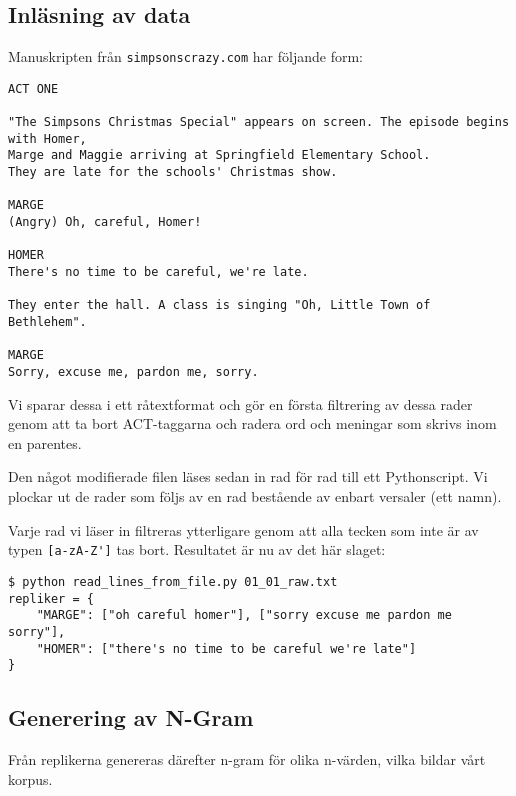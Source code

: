 \documentclass[a4paper]{article}
\begin{document}
\subsection{Inläsning av data}
Manuskripten från \nolinkurl{simpsonscrazy.com} har följande form:
\begin{verbatim}
ACT ONE

"The Simpsons Christmas Special" appears on screen. The episode begins with Homer,
Marge and Maggie arriving at Springfield Elementary School.
They are late for the schools' Christmas show.

MARGE
(Angry) Oh, careful, Homer!

HOMER
There's no time to be careful, we're late.

They enter the hall. A class is singing "Oh, Little Town of Bethlehem".

MARGE
Sorry, excuse me, pardon me, sorry.
\end{verbatim}

Vi sparar dessa i ett råtextformat och gör en första filtrering av
dessa rader genom att ta bort ACT-taggarna och radera ord och meningar
som skrivs inom en parentes.

Den något modifierade filen läses sedan in rad för rad till ett
Pythonscript. Vi plockar ut de rader som följs av en rad bestående av
enbart versaler (ett namn).

Varje rad vi läser in filtreras ytterligare genom att alla tecken som
inte är av typen \verb=[a-zA-Z']= tas bort. Resultatet är nu av det
här slaget:

\begin{verbatim}
$ python read_lines_from_file.py 01_01_raw.txt
repliker = {
    "MARGE": ["oh careful homer"], ["sorry excuse me pardon me sorry"],
    "HOMER": ["there's no time to be careful we're late"]
}
\end{verbatim}

\subsection{Generering av N-Gram}
Från replikerna genereras därefter n-gram för olika n-värden, vilka
bildar vårt korpus.

\end{document}
